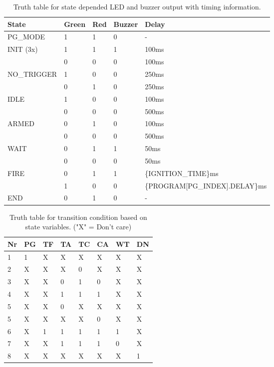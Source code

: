 \pagebreak

\begin{table}[!ht]
\centering
\begin{tabular}{|l|l|l|l|l|} 
\hline
State       &Green&Red&Buzzer&Delay                           \\ 
\hline\hline
PG\_MODE    &1&1&0& -                               \\ 
\hline
INIT (3x)   &1&1&1& 100ms                           \\
            &0 &0&0& 100ms                           \\ 
\hline
NO\_TRIGGER &1&0&0& 250ms                           \\
            &0&1&0& 250ms                           \\ 
\hline
IDLE        &1&0&0& 100ms                           \\
            &0&0&0& 500ms                           \\ 
\hline
ARMED       &0&1&0& 100ms                           \\
            &0&0&0& 500ms                           \\ 
\hline
WAIT        &0&1&1& 50ms                            \\
            &0&0&0& 50ms                            \\ 
\hline
FIRE        &0&1&1& \{IGNITION\_TIME\}ms            \\
            &1&0&0& \{PROGRAM[PG\_INDEX].DELAY\}ms  \\ 
\hline
END         &0&1&0& -                           \\
\hline
\end{tabular}
\caption{Truth table for state depended LED and buzzer output with timing information.}
\label{lst:io_out}
\end{table}


\begin{table}[!ht]
\centering
\begin{tabular}{|l|l|l|l|l|l|l|l|} 
\hline
Nr & PG & TF & TA & TC & CA & WT & DN  \\ 
\hline \hline
1  & 1  & X  & X  & X  & X  & X  & X   \\ 
\hline
2  & X  & X  & X  & 0  & X  & X  & X   \\ 
\hline
3  & X  & X  & 0  & 1  & 0  & X  & X   \\ 
\hline
4  & X  & X  & 1  & 1  & 1  & X  & X   \\ 
\hline
5  & X  & X  & 0  & X  & X  & X  & X   \\ 
\hline
5  & X  & X  & X  & X  & 0  & X  & X   \\ 
\hline
6  & X  & 1  & 1  & 1  & 1  & 1  & X   \\ 
\hline
7  & X  & X  & 1  & 1  & 1  & 0  & X   \\ 
\hline
8  & X  & X  & X  & X  & X  & X  & 1   \\
\hline
\end{tabular}
\caption{Truth table for transition condition based on state variables. ("X" = Don't care)}
\label{lst:transcond}
\end{table}

